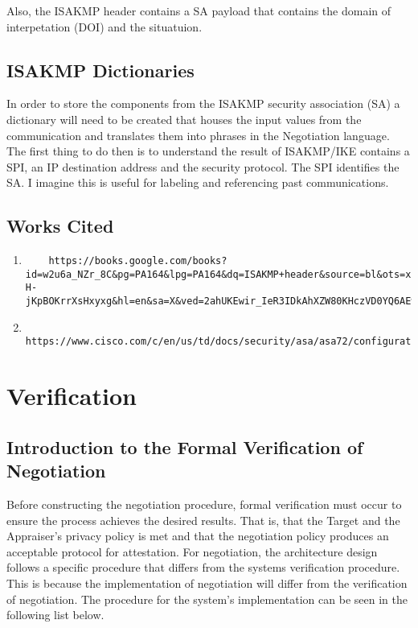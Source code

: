 \documentclass[10pt]{report}
\begin{document}
Also, the ISAKMP header contains a SA payload that contains the domain of
interpetation (DOI) and the situatuion. 

\section{ISAKMP Dictionaries}

In order to store the components from the ISAKMP security association (SA)
a dictionary will need to be created that houses the input values from the
communication and translates them into phrases in the Negotiation language.
The first thing to do then is to understand the result of ISAKMP/IKE
contains a SPI, an IP destination address and the security protocol. The
SPI identifies the SA. I imagine this is useful for labeling and
referencing past communications.  

\section{Works Cited}

\begin{enumerate}
\item  
	\begin{verbatim} 
	https://books.google.com/books?id=w2u6a_NZr_8C&pg=PA164&lpg=PA164&dq=ISAKMP+header&source=bl&ots=x45AtA8F2x&sig=ACfU3U3zxANfosIM-H-jKpBOKrrXsHxyxg&hl=en&sa=X&ved=2ahUKEwir_IeR3IDkAhXZW80KHczVD0YQ6AEwE3oECA8QAQ#v=onepage&q=ISAKMP%20header&f=false
	\end{verbatim}
\item
        \begin{verbatim}
        https://www.cisco.com/c/en/us/td/docs/security/asa/asa72/configuration/guide/conf_gd/ike.pdf 
        \end{verbatim}
\end{enumerate}

\chapter{Verification}

\section{Introduction to the Formal Verification of Negotiation}

Before constructing the negotiation procedure, formal verification must occur
to ensure the process achieves the desired results. That is, that the Target
and the Appraiser's privacy policy is met and that the negotiation policy
produces an acceptable protocol for attestation. For negotiation, the architecture
design follows a specific procedure that differs from the systems verification
procedure. This is because the implementation of negotiation will differ from the
verification of negotiation. The procedure for the system's implementation can
be seen in the following list below. 
\end{document}
